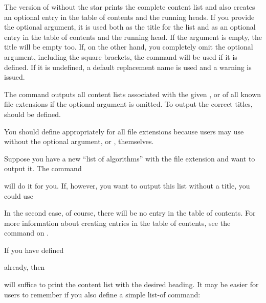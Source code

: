The version of  without the star
prints the complete content list and also creates an optional entry in the
table of contents and the running heads. If you provide the optional
 argument, it is used both as the title for the list
and as an optional entry in the table of contents and the running head.
If the  argument is empty, the
title will be empty too. If, on the other hand, you completely omit the
optional argument, including the square brackets, the
 command will be used if it is defined. If
it is undefined, a default replacement name is used and a warning is issued.

The  command outputs all
content lists associated with the given , or of all known file
extensions if the optional argument is omitted. To output
the correct titles,  should be defined.

You should define 
appropriately for all file extensions because users may use 
without the optional argument, or , themselves.
\begin{Example}
 Suppose you have a new ``list of algorithms'' with the file extension
  and want to output it. The command
\begin{lstcode}
\end{lstcode}
  will do it for you. If, however, you want to output this list without a
  title, you could use
\begin{lstcode}
\end{lstcode}
  In the second case, of course, there will be no entry in the table of
  contents. For more information about creating entries in the table of
  contents, see the  command on
  .

  If you have defined
\begin{lstcode}
  \newcommand*{\listofloaname}{%
    List of Algorithms%
  }
\end{lstcode}
  already, then
\begin{lstcode}
\end{lstcode}
  will suffice to print the content list with the desired heading. It may be
  easier for users to remember if you also define a simple list-of command:
\begin{lstcode}
  \newcommand*{\listofalgorithms}{\listoftoc{loa}}
\end{lstcode}
\end{Example}

